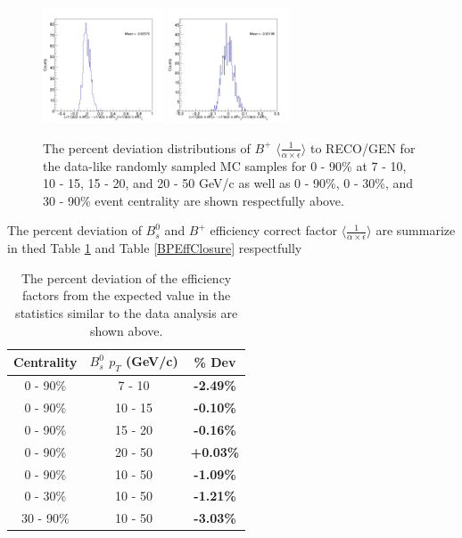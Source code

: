 \begin{figure}[h]
\begin{center}
\includegraphics[width= 0.32\textwidth]{Figures/Chapter4/BPEffONLY_30_90_-1.png}
\includegraphics[width= 0.32\textwidth]{Figures/Chapter4/BPEffONLY_0_90_-1.png} 
\caption{The percent deviation distributions of $B^+$ $\langle \frac{1}{\alpha \times \epsilon}\rangle$ to RECO/GEN for the data-like randomly sampled MC samples for 0 - 90\% at 7 - 10, 10 - 15, 15 - 20, and 20 - 50 GeV/c as well as 0 - 90\%, 0 - 30\%, and 30 - 90\% event centrality are shown respectfully above.} 
\label{BPLowStatFig} 
\end{center}
\end{figure}



The percent deviation of $B^0_s$ and $B^+$ efficiency correct factor $\langle \frac{1}{\alpha \times \epsilon}\rangle$ are summarize in thed Table \ref{BsEffClosure} and Table \ref{BPEffClosure} respectfully


\begin{table}[h]
\begin{center}
\caption{The percent deviation of the efficiency factors from the expected value in the statistics similar to the data analysis are shown above.}
\vspace{1em}
\label{BsEffClosure}
  \begin{tabular}{| c | c |c |}
    \hline
     Centrality &   $B^0_s$  $p_T$ (GeV/c) &   \% Dev \\
    \hline
    \hline
0 - 90\% & 7 - 10 &  \textbf{-2.49\% }   \\ 
0 - 90\% & 10 - 15 &  \textbf{-0.10\% }   \\ 
0 - 90\% & 15 - 20 &   \textbf{-0.16\% }   \\ 
0 - 90\% & 20 - 50 &  \textbf{+0.03\% }   \\ 
0 - 90\% & 10 - 50 &  \textbf{-1.09\% }   \\ 
0 - 30\% & 10 - 50 &   \textbf{-1.21\% }   \\ 
30 - 90\% & 10 - 50 & \textbf{-3.03\% }   \\ 
    \hline
    \hline
\end{tabular}
\end{center}
\end{table}

